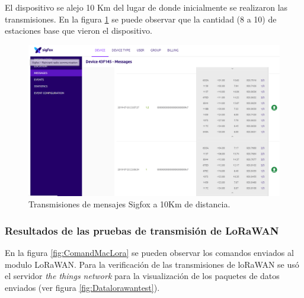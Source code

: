 El dispositivo se alejo 10 Km del lugar de donde inicialmente se realizaron las transmisiones. En la figura \ref{fig:AntenasSigfoxAlejada} se puede observar que la cantidad (8 a 10) de estaciones base que vieron el dispositivo.
\begin{figure}[H]
	\centering
	\includegraphics[scale=.45]{./Figures/AntenasSigfoxAlejada.PNG}
	\caption{Transmisiones de mensajes Sigfox a 10Km de distancia.}
	\label{fig:AntenasSigfoxAlejada}
\end{figure}

\subsubsection{Resultados de las pruebas de transmisión de LoRaWAN}

En la figura \ref{fig:ComandMacLora} se pueden observar los comandos enviados al modulo LoRaWAN. Para la verificación de las transmisiones de loRaWAN se usó el servidor \textit{the things network} para la visualización de los paquetes de datos enviados (ver figura \ref{fig:Datalorawantest}).


